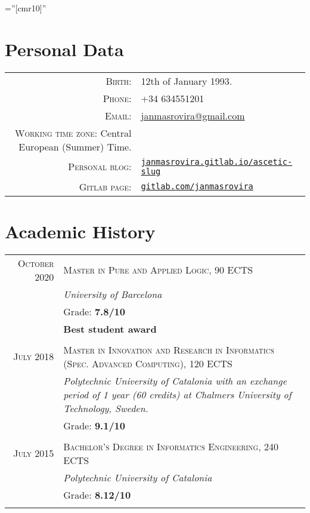 \documentclass[a4paper,11pt]{article}
\begin{document}
\pagestyle{empty}

\font\fb=''[cmr10]''

\par{\bigskip\par}

\section{Personal Data}

\begin{tabular}{rl}
\textsc{Birth:} & 12th of January 1993.\\
\textsc{Phone:} & +34 634551201\\
\textsc{Email:} & \href{mailto:janmasrovira@gmail.com}{janmasrovira@gmail.com} \\
\textsc{Working time zone:} Central European (Summer) Time.&  \\
\textsc{Personal blog:} & \href{https://janmasrovira.gitlab.io/ascetic-slug/}{\texttt{janmasrovira.gitlab.io/ascetic-slug}} \\
  \textsc{Gitlab page:} & \href{https://gitlab.com/janmasrovira}{\texttt{gitlab.com/janmasrovira}}
\end{tabular}

\section{Academic History}

\begin{tabular}{r|p{11cm}}
  \textsc{October 2020} & \textsc{Master in Pure and Applied Logic, 90 ECTS} \\
 & \emph{University of Barcelona}\\
   & Grade: \textbf{7.8/10} \\
   & \textbf{Best student award} \\
\multicolumn{2}{c}{} \\

  \textsc{July 2018} & \textsc{Master in Innovation and Research in Informatics (Spec. Advanced Computing), 120 ECTS} \\
               & \emph{Polytechnic University of Catalonia with an exchange period of 1 year (60 credits) at Chalmers University of Technology, Sweden.}\\
  & Grade: \textbf{9.1/10} \\
  \multicolumn{2}{c}{} \\

  \textsc{July 2015} & \textsc{Bachelor's Degree in Informatics Engineering, 240 ECTS} \\
               & \emph{Polytechnic University of Catalonia}\\
               & Grade: \textbf{8.12/10} \\
  \multicolumn{2}{c}{} \\
\end{tabular}
\end{document}
